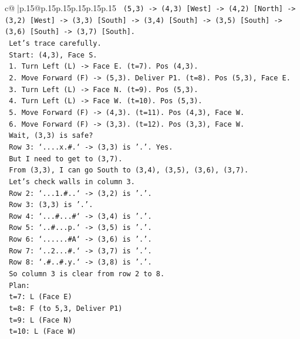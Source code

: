 \documentclass{article}
\begin{document}
{\begin{supertabular}{c@{$\;$}|p{.15\linewidth}@{}p{.15\linewidth}p{.15\linewidth}p{.15\linewidth}p{.15\linewidth}p{.15\linewidth}}
{{{\texttt{   (5,3) {-}> (4,3) {[}West{]} {-}> (4,2) {[}North{]} {-}> (3,2) {[}West{]} {-}> (3,3) {[}South{]} {-}> (3,4) {[}South{]} {-}> (3,5) {[}South{]} {-}> (3,6) {[}South{]} {-}> (3,7) {[}South{]}.} \\
\texttt{   Let's trace carefully.} \\
\texttt{   Start: (4,3), Face S.} \\
\texttt{   1. Turn Left (L) {-}> Face E. (t=7). Pos (4,3).} \\
\texttt{   2. Move Forward (F) {-}> (5,3). Deliver P1. (t=8). Pos (5,3), Face E.} \\
\texttt{   3. Turn Left (L) {-}> Face N. (t=9). Pos (5,3).} \\
\texttt{   4. Turn Left (L) {-}> Face W. (t=10). Pos (5,3).} \\
\texttt{   5. Move Forward (F) {-}> (4,3). (t=11). Pos (4,3), Face W.} \\
\texttt{   6. Move Forward (F) {-}> (3,3). (t=12). Pos (3,3), Face W.} \\
\texttt{   Wait, (3,3) is safe?} \\
\texttt{   Row 3: `....x.\#.` {-}> (3,3) is '.'. Yes.} \\
\texttt{   But I need to get to (3,7).} \\
\texttt{   From (3,3), I can go South to (3,4), (3,5), (3,6), (3,7).} \\
\texttt{   Let's check walls in column 3.} \\
\texttt{   Row 2: `...1.\#..` {-}> (3,2) is '.'.} \\
\texttt{   Row 3: (3,3) is '.'.} \\
\texttt{   Row 4: `...\#...\#` {-}> (3,4) is '.'.} \\
\texttt{   Row 5: `..\#...p.` {-}> (3,5) is '.'.} \\
\texttt{   Row 6: `......\#A` {-}> (3,6) is '.'.} \\
\texttt{   Row 7: `..2...\#.` {-}> (3,7) is '.'.} \\
\texttt{   Row 8: `.\#..\#.y.` {-}> (3,8) is '.'.} \\
\texttt{   So column 3 is clear from row 2 to 8.} \\
\texttt{   Plan:} \\
\texttt{   t=7: L (Face E)} \\
\texttt{   t=8: F (to 5,3, Deliver P1)} \\
\texttt{   t=9: L (Face N)} \\
\texttt{   t=10: L (Face W)} \\
}}}
\end{supertabular}}
\end{document}
